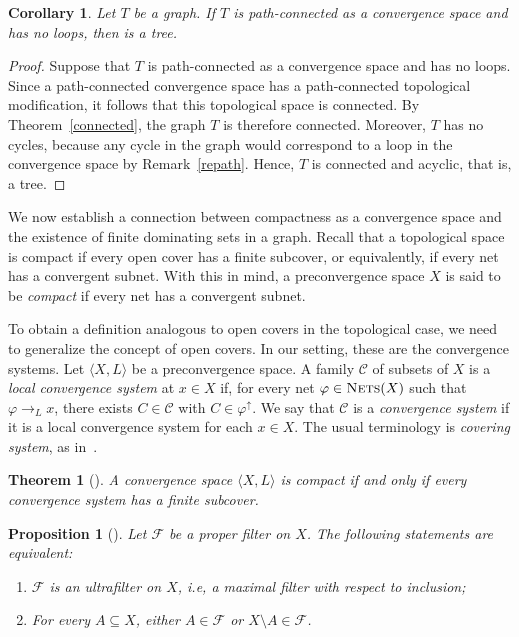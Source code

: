 \documentclass{amsart}
\newtheorem{theorem}{Theorem}[section]
\newtheorem{proposition}{Proposition}[section]
\newtheorem{corollary}{Corollary}[section]
\theoremstyle{definition}
\theoremstyle{remark}
\numberwithin{equation}{section}
\begin{document}
\begin{corollary}
Let $T$ be a graph. If $T$ is path-connected as a convergence space and has no loops, then is a tree.
\end{corollary}

\begin{proof}
	
		Suppose that $T$ is path-connected as a convergence space and has no loops. 
		Since a path-connected convergence space has a path-connected topological modification, it follows that this topological space is connected. 
		By Theorem~\ref{connected}, the graph $T$ is therefore connected. 
		Moreover, $T$ has no cycles, because any cycle in the graph would correspond to a loop in the convergence space by Remark~\ref{repath}. 
		Hence, $T$ is connected and acyclic, that is, a tree.
\end{proof}


\label{sec3}

We now establish a connection between compactness as a convergence space and the existence of finite dominating sets in a graph. Recall that a topological space is compact if every open cover has a finite subcover, or equivalently, if every net has a convergent subnet. With this in mind, a preconvergence space $X$ is said to be \emph{compact} if every net has a convergent subnet.

To obtain a definition analogous to open covers in the topological case, we need to generalize the concept of open covers. In our setting, these are the convergence systems. Let $\langle X,L\rangle$ be a preconvergence space. A family $\mathcal{C}$ of subsets of $X$ is a \emph{local convergence system} at $x\in X$ if, for every net $\varphi\in\textsc{Nets}(X)$ such that $\varphi\to_L x$, there exists $C\in\mathcal{C}$ with $C\in\varphi^{\uparrow}$. We say that $\mathcal{C}$ is a \emph{convergence system} if it is a local convergence system for each $x\in X$. The usual terminology is \emph{covering system}, as in~\cite{BB}.


	
\begin{theorem}[{\cite[Proposition 1.4.15]{BB}}]
			A convergence space $\langle X,L\rangle$ is compact if and only if every convergence system has a finite subcover.
	\end{theorem}
	
	
\begin{proposition}[{\cite[Lemma 7.4]{Jech}}]
	Let $\mathcal{F}$ be a proper filter on $X$. The following statements are equivalent:
	\begin{enumerate}
		\item $\mathcal{F}$ is an ultrafilter on $X$, i.e, a maximal filter with respect to inclusion;
		\item For every $A \subseteq X$, either $A \in \mathcal{F}$ or $X \setminus A \in \mathcal{F}$.

	\end{enumerate}
\end{proposition}
\end{document}
